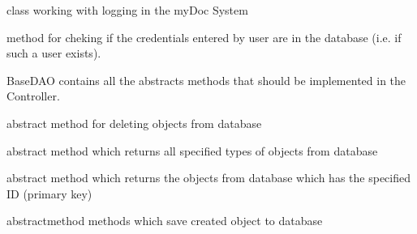\documentclass[letterpaper,10pt,english]{sphinxmanual}
\begin{document}

\begin{fulllineitems}
\label{dao:doctors.dao.AuthentificationDAO}
class working with logging in the myDoc System

\begin{fulllineitems}
\label{dao:doctors.dao.AuthentificationDAO.findUserByUsername}
method for cheking if the credentials entered by user are in the database (i.e. if such a user exists).

\end{fulllineitems}


\end{fulllineitems}


\begin{fulllineitems}
\label{dao:doctors.dao.BaseDAO}
BaseDAO contains all the abstracts methods that should be implemented in the Controller.

\begin{fulllineitems}
\label{dao:doctors.dao.BaseDAO.delete}
abstract method for deleting objects from database

\end{fulllineitems}


\begin{fulllineitems}
\label{dao:doctors.dao.BaseDAO.getAll}
abstract method which returns all specified types of objects from database

\end{fulllineitems}


\begin{fulllineitems}
\label{dao:doctors.dao.BaseDAO.getById}
abstract method which returns the objects from database which has the specified ID (primary key)

\end{fulllineitems}


\begin{fulllineitems}
\label{dao:doctors.dao.BaseDAO.save}
abstractmethod methods which save created object to database

\end{fulllineitems}


\end{fulllineitems}
\end{document}
